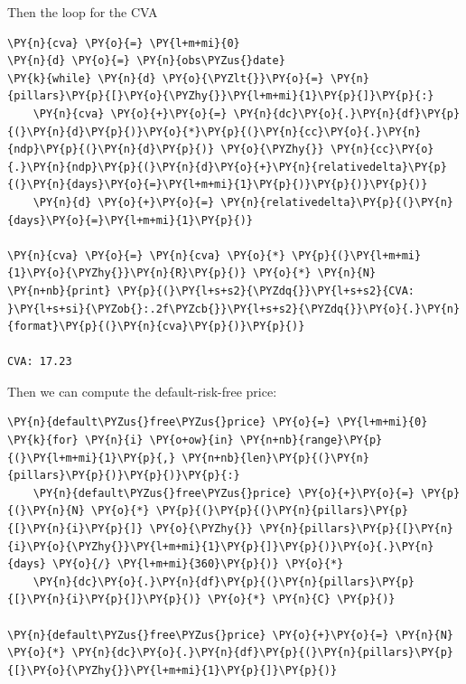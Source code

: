 Then the loop for the CVA
\begin{tcolorbox}[breakable, size=fbox, boxrule=1pt, pad at break*=1mm,colback=cellbackground, colframe=cellborder]
\begin{Verbatim}[commandchars=\\\{\}]
\PY{n}{cva} \PY{o}{=} \PY{l+m+mi}{0}
\PY{n}{d} \PY{o}{=} \PY{n}{obs\PYZus{}date}
\PY{k}{while} \PY{n}{d} \PY{o}{\PYZlt{}}\PY{o}{=} \PY{n}{pillars}\PY{p}{[}\PY{o}{\PYZhy{}}\PY{l+m+mi}{1}\PY{p}{]}\PY{p}{:}
    \PY{n}{cva} \PY{o}{+}\PY{o}{=} \PY{n}{dc}\PY{o}{.}\PY{n}{df}\PY{p}{(}\PY{n}{d}\PY{p}{)}\PY{o}{*}\PY{p}{(}\PY{n}{cc}\PY{o}{.}\PY{n}{ndp}\PY{p}{(}\PY{n}{d}\PY{p}{)} \PY{o}{\PYZhy{}} \PY{n}{cc}\PY{o}{.}\PY{n}{ndp}\PY{p}{(}\PY{n}{d}\PY{o}{+}\PY{n}{relativedelta}\PY{p}{(}\PY{n}{days}\PY{o}{=}\PY{l+m+mi}{1}\PY{p}{)}\PY{p}{)}\PY{p}{)}
    \PY{n}{d} \PY{o}{+}\PY{o}{=} \PY{n}{relativedelta}\PY{p}{(}\PY{n}{days}\PY{o}{=}\PY{l+m+mi}{1}\PY{p}{)}
	
\PY{n}{cva} \PY{o}{=} \PY{n}{cva} \PY{o}{*} \PY{p}{(}\PY{l+m+mi}{1}\PY{o}{\PYZhy{}}\PY{n}{R}\PY{p}{)} \PY{o}{*} \PY{n}{N}
\PY{n+nb}{print} \PY{p}{(}\PY{l+s+s2}{\PYZdq{}}\PY{l+s+s2}{CVA: }\PY{l+s+si}{\PYZob{}:.2f\PYZcb{}}\PY{l+s+s2}{\PYZdq{}}\PY{o}{.}\PY{n}{format}\PY{p}{(}\PY{n}{cva}\PY{p}{)}\PY{p}{)}

CVA: 17.23
\end{Verbatim}
\end{tcolorbox}

Then we can compute the default-risk-free price:

\begin{tcolorbox}[breakable, size=fbox, boxrule=1pt, pad at break*=1mm,colback=cellbackground, colframe=cellborder]
\begin{Verbatim}[commandchars=\\\{\}]
\PY{n}{default\PYZus{}free\PYZus{}price} \PY{o}{=} \PY{l+m+mi}{0}
\PY{k}{for} \PY{n}{i} \PY{o+ow}{in} \PY{n+nb}{range}\PY{p}{(}\PY{l+m+mi}{1}\PY{p}{,} \PY{n+nb}{len}\PY{p}{(}\PY{n}{pillars}\PY{p}{)}\PY{p}{)}\PY{p}{:}
    \PY{n}{default\PYZus{}free\PYZus{}price} \PY{o}{+}\PY{o}{=} \PY{p}{(}\PY{n}{N} \PY{o}{*} \PY{p}{(}\PY{p}{(}\PY{n}{pillars}\PY{p}{[}\PY{n}{i}\PY{p}{]} \PY{o}{\PYZhy{}} \PY{n}{pillars}\PY{p}{[}\PY{n}{i}\PY{o}{\PYZhy{}}\PY{l+m+mi}{1}\PY{p}{]}\PY{p}{)}\PY{o}{.}\PY{n}{days} \PY{o}{/} \PY{l+m+mi}{360}\PY{p}{)} \PY{o}{*} 
	\PY{n}{dc}\PY{o}{.}\PY{n}{df}\PY{p}{(}\PY{n}{pillars}\PY{p}{[}\PY{n}{i}\PY{p}{]}\PY{p}{)} \PY{o}{*} \PY{n}{C} \PY{p}{)}
	
\PY{n}{default\PYZus{}free\PYZus{}price} \PY{o}{+}\PY{o}{=} \PY{n}{N} \PY{o}{*} \PY{n}{dc}\PY{o}{.}\PY{n}{df}\PY{p}{(}\PY{n}{pillars}\PY{p}{[}\PY{o}{\PYZhy{}}\PY{l+m+mi}{1}\PY{p}{]}\PY{p}{)}
\end{Verbatim}
\end{tcolorbox}

